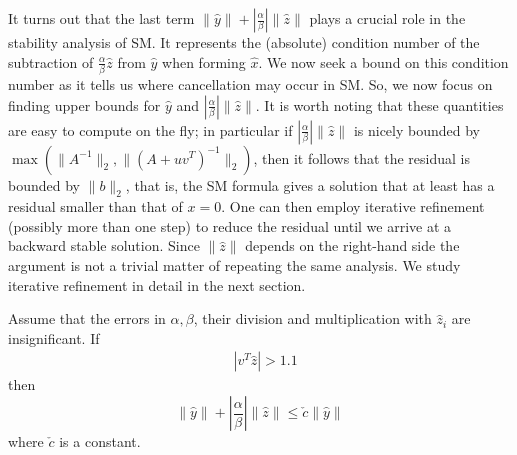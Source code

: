 \documentclass{siamltex}
\begin{document}
It turns out that the last term $\|\hat y\| +  |\frac{\alpha}{\beta}| \|\hat z\|$ plays a crucial role in the stability analysis of SM. It represents the (absolute) condition number of the subtraction of $\frac{\alpha}{\beta} \hat z$ from  $\hat y$ when forming $\hat x$. We now seek a bound on this condition number as it tells us where cancellation may occur in SM. So, we now focus on finding upper bounds for $\hat y$ and $|\frac{\alpha}{\beta}| \|\hat z\|$. It is worth noting that these quantities are easy to compute on the fly; in particular if $|\frac{\alpha}{\beta}| \|\hat z\|$ is nicely bounded by $\max(\|A^{-1}\|_2,\|(A+uv^T)^{-1}\|_2)$, then it follows that the residual is bounded by $\|b\|_2$, that is, the SM formula gives a solution that at least has a residual smaller than that of $x=0$. One can then employ iterative refinement (possibly more than one step) to reduce the residual until we arrive at a backward stable solution. Since $\|\hat z\|$ depends on the right-hand side the argument is not a trivial matter of repeating the same analysis. We study iterative refinement in detail in the next section.

\begin{lemma} \label{help_bnd:lem}
Assume that the errors in $\alpha, \beta$, their division and multiplication with $\hat z_i$ are insignificant. If 
\begin{eqnarray}
& |v^T \hat z| > 1.1 \label{hypoth1:eq}
\end{eqnarray}
then 
\begin{equation}
\label{lemmaBnd:eq}
\|\hat y\| +  |\frac{\alpha}{\beta}| \|\hat z\| \leq \check c\|\hat y\|
\end{equation}
where $\check c$ is a constant. 
\end{lemma}
\end{document}
